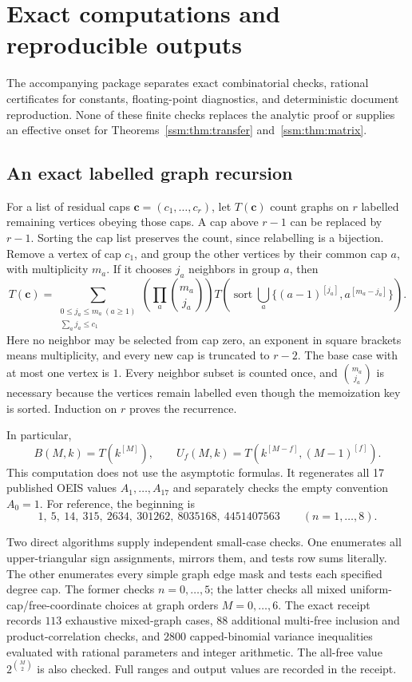 \section{Exact computations and reproducible outputs}\label{ssm:sec:computation}
The accompanying package separates exact combinatorial checks, rational certificates for constants, floating-point diagnostics, and deterministic document reproduction. None of these finite checks replaces the analytic proof or supplies an effective onset for Theorems~\ref{ssm:thm:transfer} and~\ref{ssm:thm:matrix}.

\subsection{An exact labelled graph recursion}
For a list of residual caps $\boldsymbol c=(c_1,\ldots,c_r)$, let $T(\boldsymbol c)$ count graphs on $r$ labelled remaining vertices obeying those caps. A cap above $r-1$ can be replaced by $r-1$. Sorting the cap list preserves the count, since relabelling is a bijection. Remove a vertex of cap $c_1$, and group the other vertices by their common cap $a$, with multiplicity $m_a$. If it chooses $j_a$ neighbors in group $a$, then
\begin{equation}\label{ssm:eq:caprecurrence}
 T(\boldsymbol c)=
 \sum_{\substack{0\le j_a\le m_a\ (a\ge1)\\\sum_a j_a\le c_1}}
 \left(\prod_a\binom{m_a}{j_a}\right)
 T\left(\operatorname{sort}\bigcup_a
 \{(a-1)^{[j_a]},a^{[m_a-j_a]}\}\right).
\end{equation}
Here no neighbor may be selected from cap zero, an exponent in square brackets means multiplicity, and every new cap is truncated to $r-2$. The base case with at most one vertex is $1$. Every neighbor subset is counted once, and $\binom{m_a}{j_a}$ is necessary because the vertices remain labelled even though the memoization key is sorted. Induction on $r$ proves the recurrence.

In particular,
\[
 B(M,k)=T(k^{[M]}),\qquad
 U_f(M,k)=T(k^{[M-f]},(M-1)^{[f]}).
\]
This computation does not use the asymptotic formulas. It regenerates all 17 published OEIS values $A_1,\ldots,A_{17}$ and separately checks the empty convention $A_0=1$. For reference, the beginning is
\[
 1,\ 5,\ 14,\ 315,\ 2634,\ 301262,\ 8035168,\ 4451407563
 \qquad(n=1,\ldots,8).
\]

Two direct algorithms supply independent small-case checks. One enumerates all upper-triangular sign assignments, mirrors them, and tests row sums literally. The other enumerates every simple graph edge mask and tests each specified degree cap. The former checks $n=0,\ldots,5$; the latter checks all mixed uniform-cap/free-coordinate choices at graph orders $M=0,\ldots,6$. The exact receipt records $113$ exhaustive mixed-graph cases, $88$ additional multi-free inclusion and product-correlation checks, and $2800$ capped-binomial variance inequalities evaluated with rational parameters and integer arithmetic. The all-free value $2^{\binom M2}$ is also checked. Full ranges and output values are recorded in the receipt.

